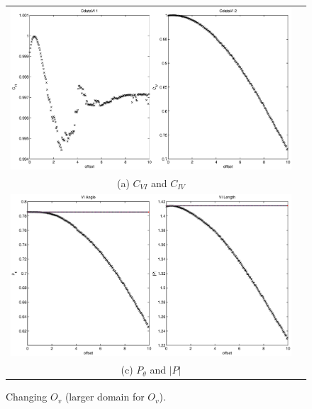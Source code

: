 \documentclass{article}
\begin{document}
\begin{figure}[H]
\begin{tabular}{cc}
\includegraphics[scale=0.5]{RLcirc_varyV_offsetlong2.eps} \\
(a) $C_{VI}$ and $C_{IV}$ \\[6pt]
\includegraphics[scale=0.5]{RLcirc_varyV_offsetlong.eps} \\
(c) $P_\theta$ and $|P|$ \\[6pt]
\end{tabular}
\caption{Changing $O_v$ (larger domain for $O_v$).}
\label{fig:Ov2}
\end{figure}
\end{document}
